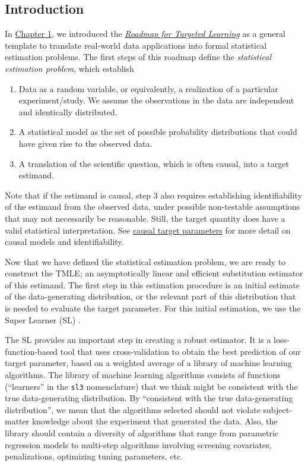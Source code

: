 \documentclass[12pt, krantz2,]{krantz}
\providecommand{\tightlist}{%
  \setlength{\itemsep}{0pt}\setlength{\parskip}{0pt}}
\theoremstyle{definition}
\theoremstyle{definition}
\theoremstyle{definition}
\newcommand{\1}{\mathbbm{1}}
\begin{document}
\hypertarget{introduction-2}{%
\subsection*{Introduction}\label{introduction-2}}


In \protect\hyperlink{intro}{Chapter 1}, we introduced the \protect\hyperlink{roadmap}{\emph{Roadmap for Targeted
Learning}} as a general template to translate real-world data
applications into formal statistical estimation problems. The first steps of
this roadmap define the \emph{statistical estimation problem}, which establish

\begin{enumerate}
\def\labelenumi{\arabic{enumi}.}
\tightlist
\item
  Data as a random variable, or equivalently, a realization of a particular
  experiment/study. We assume the observations in the data are independent and
  identically distributed.
\item
  A statistical model as the set of possible probability distributions that
  could have given rise to the observed data.
\item
  A translation of the scientific question, which is often causal, into a
  target estimand.
\end{enumerate}

Note that if the estimand is causal, step 3 also requires establishing
identifiability of the estimand from the observed data, under possible
non-testable assumptions that may not necessarily be reasonable. Still, the
target quantity does have a valid statistical interpretation. See \protect\hyperlink{causal}{causal target
parameters} for more detail on causal models and identifiability.

Now that we have defined the statistical estimation problem, we are ready to
construct the TMLE; an asymptotically linear and efficient substitution
estimator of this estimand. The first step in this estimation procedure is an
initial estimate of the data-generating distribution, or the relevant part of
this distribution that is needed to evaluate the target parameter. For this
initial estimation, we use the Super Learner (SL) \citep{vdl2007super}.

The SL provides an important step in creating a robust estimator. It is a
loss-function-based tool that uses cross-validation to obtain the best
prediction of our target parameter, based on a weighted average of a library of
machine learning algorithms. The library of machine learning algorithms consists
of functions (``learners'' in the \texttt{sl3} nomenclature) that we think might be
consistent with the true data-generating distribution. By ``consistent with the
true data-generating distribution'', we mean that the algorithms selected should
not violate subject-matter knowledge about the experiment that generated the
data. Also, the library should contain a diversity of algorithms that range from
parametric regression models to multi-step algorithms involving screening
covariates, penalizations, optimizing tuning parameters, etc.
\end{document}
